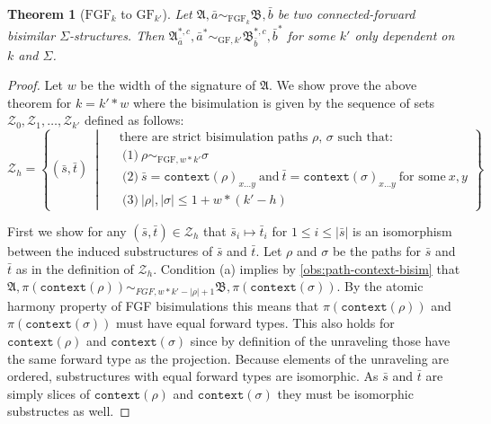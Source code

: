 \documentclass[draft]{scrartcl}
\newtheorem{theorem}{Theorem}
\theoremstyle{definition}
\newcommand{\context}[1]{\mathtt{context}(#1)}
\begin{document}
\begin{theorem}[$\textrm{FGF}_{k}$ to $\textrm{GF}_{k'}$]
  Let $\mathfrak{A}, \bar{a} \sim_{\textrm{FGF}_{k}}\mathfrak{B}, \bar{b}$ be two connected-forward bisimilar $\Sigma$-structures.
  Then $\mathfrak{A}^{*,c}_{\bar{a}}, \bar{a}^{*} \sim_{\textrm{GF},k'} \mathfrak{B}^{*,c}_{\bar{b}}, \bar{b}^{*}$ for some $k'$ only dependent on $k$ and $\Sigma$.
\end{theorem}

\begin{proof}
  Let $w$ be the width of the signature of $\mathfrak{A}$.
  We show prove the above theorem for $k = k' * w$ where the bisimulation is given by the sequence of sets $\mathcal{Z}_{0}, \mathcal{Z}_{1}, \ldots, \mathcal{Z}_{k'}$ defined as follows:
  \begin{equation*}
    \mathcal{Z}_{h} = \left\{
      (\bar{s}, \bar{t})
      \ \middle|\
      \begin{aligned}
        & \text{there are strict bisimulation paths $\rho$, $\sigma$ such that:} \\
        & \ \text{(1)}\ \rho \sim_{\textrm{FGF}, w*k'} \sigma \\
        & \ \text{(2)}\ \bar{s} = \context{\rho}_{x\ldots{}y}\ \text{and}\ \bar{t} = \context{\sigma}_{x\ldots{}y}\ \text{for some}\ x, y \\
        & \ \text{(3)}\ |\rho|, |\sigma| \le 1 + w * (k' - h)
      \end{aligned}
    \right\}
  \end{equation*}

  First we show for any $(\bar{s}, \bar{t}) \in \mathcal{Z}_{h}$ that $\bar{s}_{i} \mapsto \bar{t}_{i}$ for $1 \le i \le |\bar{s}|$ is an isomorphism between the induced substructures of $\bar{s}$ and $\bar{t}$.
  Let $\rho$ and $\sigma$ be the paths for $\bar{s}$ and $\bar{t}$ as in the definition of $\mathcal{Z}_{h}$.
  Condition (a) implies by \cref{obs:path-context-bisim} that $\mathfrak{A}, \pi(\context{\rho}) \sim_{FGF,w*k'-|\rho|+1} \mathfrak{B}, \pi(\context{\sigma})$.
  By the atomic harmony property of FGF bisimulations this means that $\pi(\context{\rho})$ and $\pi(\context{\sigma})$ must have equal forward types.
  This also holds for $\context{\rho}$ and $\context{\sigma}$ since by definition of the unraveling those have the same forward type as the projection.
  Because elements of the unraveling are ordered, substructures with equal forward types are isomorphic.
  As $\bar{s}$ and $\bar{t}$ are simply slices of $\context{\rho}$ and $\context{\sigma}$ they must be isomorphic substructes as well.


\end{proof}
\end{document}

